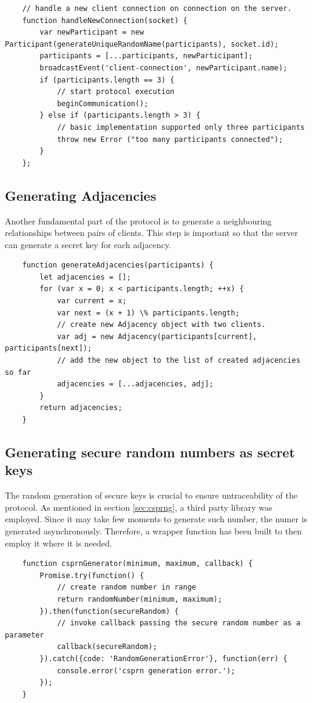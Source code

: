\begin{lstlisting}
    // handle a new client connection on connection on the server.
    function handleNewConnection(socket) {
        var newParticipant = new Participant(generateUniqueRandomName(participants), socket.id);
        participants = [...participants, newParticipant];
        broadcastEvent('client-connection', newParticipant.name);
        if (participants.length == 3) {
            // start protocol execution
            beginCommunication();
        } else if (participants.length > 3) {
            // basic implementation supported only three participants
            throw new Error ("too many participants connected");
        }
    };
\end{lstlisting}


\subsection{Generating Adjacencies}
Another fundamental part of the protocol is to generate a neighbouring relationships between pairs of clients. This step is important so that the server can generate a secret key for each adjacency. 

\begin{lstlisting}
    function generateAdjacencies(participants) {
        let adjacencies = [];
        for (var x = 0; x < participants.length; ++x) {
            var current = x;
            var next = (x + 1) \% participants.length;
            // create new Adjacency object with two clients.
            var adj = new Adjacency(participants[current], participants[next]);
            // add the new object to the list of created adjacencies so far
            adjacencies = [...adjacencies, adj];
        }
        return adjacencies;
    }
\end{lstlisting}

\subsection{Generating secure random numbers as secret keys}
The random generation of secure keys is crucial to ensure untraceability of the protocol. As mentioned in section \ref{sec:csprng}, a third party library was employed. Since it may take few moments to generate such number, the numer is generated asynchronously. Therefore, a wrapper function has been built to then employ it where it is needed.

\begin{lstlisting}
    function csprnGenerator(minimum, maximum, callback) {
        Promise.try(function() {
            // create random number in range
            return randomNumber(minimum, maximum);
        }).then(function(secureRandom) {
            // invoke callback passing the secure random number as a parameter
            callback(secureRandom);
        }).catch({code: 'RandomGenerationError'}, function(err) {
            console.error('csprn generation error.');
        });
    }
\end{lstlisting}

